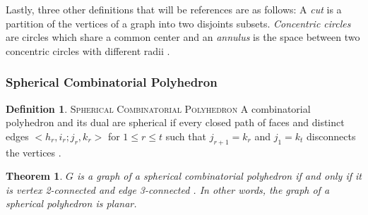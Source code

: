 \documentclass[11pt]{article}
\newtheorem{theorem}{Theorem}[section]
\theoremstyle{definition}
\newtheorem{definition}{Definition}[section]
\begin{document}
	Lastly, three other definitions that will be references are as follows:
	A \emph{cut} is a partition of the vertices of a graph into two disjoints subsets. 
	\emph{Concentric circles} are circles which share a common center and an \emph{annulus} is the space between two concentric circles with different radii \cite{mathworld:ConcentricCircles}.

\subsubsection{Spherical Combinatorial Polyhedron}
	\theoremstyle{definition}
	\begin{definition}{\textsc{Spherical Combinatorial Polyhedron}}
		A combinatorial polyhedron and its dual are spherical if every closed path of faces and distinct edges $<h_r,i_r;j_r,k_r>$ for $1 \leq r \leq t$ such that $j_{r+1} = k_r$ and $j_1 = k_t$ disconnects the vertices \cite{mccProof}.
	\end{definition}
	
	\begin{theorem}
		$G$ is a graph of a spherical combinatorial polyhedron if and only if it is vertex 2-connected and edge 3-connected \cite{mccProof}. 
		In other words, the graph of a spherical polyhedron is planar.
	\end{theorem}
\end{document}
